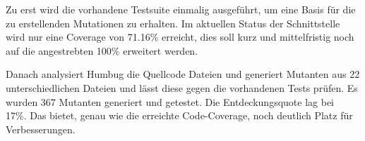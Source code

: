 Zu erst wird die vorhandene Testsuite einmalig ausgeführt, um eine Basis für die zu erstellenden Mutationen zu erhalten. Im aktuellen Status der Schnittstelle wird nur eine Coverage von 71.16\% erreicht, dies soll kurz und mittelfristig noch auf die angestrebten 100\% erweitert werden.

Danach analysiert Humbug die Quellcode Dateien und generiert Mutanten aus 22 unterschiedlichen Dateien und lässt diese gegen die vorhandenen Tests prüfen. Es wurden 367 Mutanten generiert und getestet. Die Entdeckungsquote lag bei ~ 17\%. Das bietet, genau wie die erreichte Code-Coverage, noch deutlich Platz für Verbesserungen.



